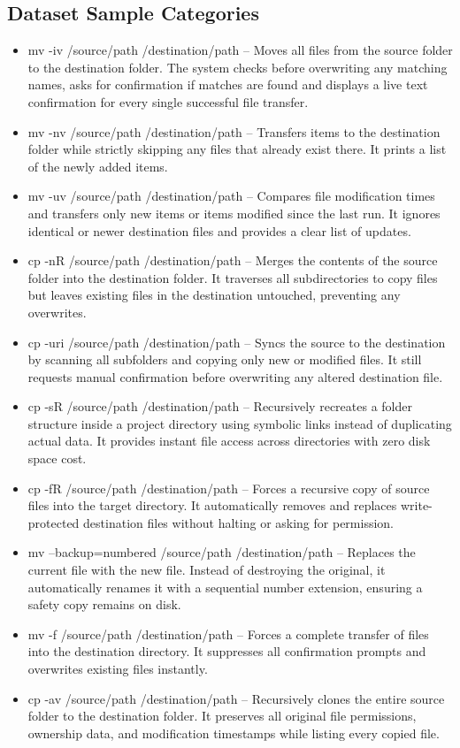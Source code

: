 \begin{appendix}

\section{Dataset Sample Categories}\label{app:dataset_sample_cats}
\begin{itemize}
    \item mv -iv /source/path /destination/path -- Moves all files from the source folder to the destination folder. The system checks before overwriting any matching names, asks for confirmation if matches are found and displays a live text confirmation for every single successful file transfer.
    \item mv -nv /source/path /destination/path -- Transfers items to the destination folder while strictly skipping any files that already exist there. It prints a list of the newly added items.
    \item mv -uv /source/path /destination/path -- Compares file modification times and transfers only new items or items modified since the last run. It ignores identical or newer destination files and provides a clear list of updates.
    \item cp -nR /source/path /destination/path -- Merges the contents of the source folder into the destination folder. It traverses all subdirectories to copy files but leaves existing files in the destination untouched, preventing any overwrites.
    \item cp -uri /source/path /destination/path -- Syncs the source to the destination by scanning all subfolders and copying only new or modified files. It still requests manual confirmation before overwriting any altered destination file.
    \item cp -sR /source/path /destination/path -- Recursively recreates a folder structure inside a project directory using symbolic links instead of duplicating actual data. It provides instant file access across directories with zero disk space cost.
    \item cp -fR /source/path /destination/path -- Forces a recursive copy of source files into the target directory. It automatically removes and replaces write-protected destination files without halting or asking for permission.
    \item mv --backup=numbered /source/path /destination/path -- Replaces the current file with the new file. Instead of destroying the original, it automatically renames it with a sequential number extension, ensuring a safety copy remains on disk.
    \item mv -f /source/path /destination/path -- Forces a complete transfer of files into the destination directory. It suppresses all confirmation prompts and overwrites existing files instantly.
    \item cp -av /source/path /destination/path -- Recursively clones the entire source folder to the destination folder. It preserves all original file permissions, ownership data, and modification timestamps while listing every copied file.
\end{itemize}


\end{appendix}
